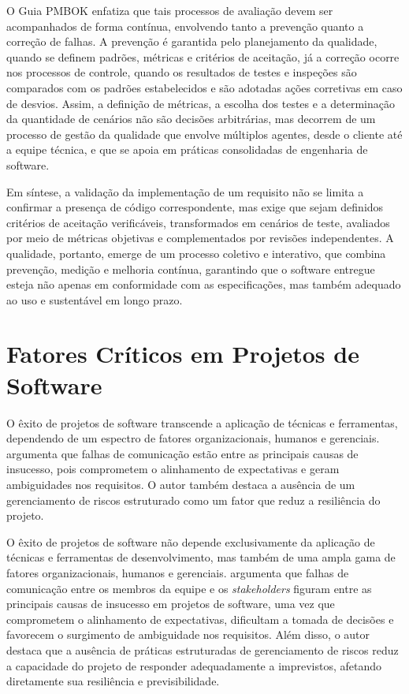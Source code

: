 O Guia PMBOK \cite{pmi2008} enfatiza que tais processos de avaliação devem ser acompanhados de forma contínua, envolvendo tanto a prevenção quanto a correção de falhas. A prevenção é garantida pelo planejamento da qualidade, quando se definem padrões, métricas e critérios de aceitação, já a correção ocorre nos processos de controle, quando os resultados de testes e inspeções são comparados com os padrões estabelecidos e são adotadas ações corretivas em caso de desvios. Assim, a definição de métricas, a escolha dos testes e a determinação da quantidade de cenários não são decisões arbitrárias, mas decorrem de um processo de gestão da qualidade que envolve múltiplos agentes, desde o cliente até a equipe técnica, e que se apoia em práticas consolidadas de engenharia de software.

Em síntese, a validação da implementação de um requisito não se limita a confirmar a presença de código correspondente, mas exige que sejam definidos critérios de aceitação verificáveis, transformados em cenários de teste, avaliados por meio de métricas objetivas e complementados por revisões independentes. A qualidade, portanto, emerge de um processo coletivo e interativo, que combina prevenção, medição e melhoria contínua, garantindo que o software entregue esteja não apenas em conformidade com as especificações, mas também adequado ao uso e sustentável em longo prazo.

\section{Fatores Críticos em Projetos de Software}

O êxito de projetos de software transcende a aplicação de técnicas e ferramentas, dependendo de um espectro de fatores organizacionais, humanos e gerenciais.  argumenta que falhas de comunicação estão entre as principais causas de insucesso, pois comprometem o alinhamento de expectativas e geram ambiguidades nos requisitos. O autor também destaca a ausência de um gerenciamento de riscos estruturado como um fator que reduz a resiliência do projeto.

O êxito de projetos de software não depende exclusivamente da aplicação de técnicas e ferramentas de desenvolvimento, mas também de uma ampla gama de fatores organizacionais, humanos e gerenciais.  argumenta que falhas de comunicação entre os membros da equipe e os \textit{stakeholders} figuram entre as principais causas de insucesso em projetos de software, uma vez que comprometem o alinhamento de expectativas, dificultam a tomada de decisões e favorecem o surgimento de ambiguidade nos requisitos. Além disso, o autor destaca que a ausência de práticas estruturadas de gerenciamento de riscos reduz a capacidade do projeto de responder adequadamente a imprevistos, afetando diretamente sua resiliência e previsibilidade.

